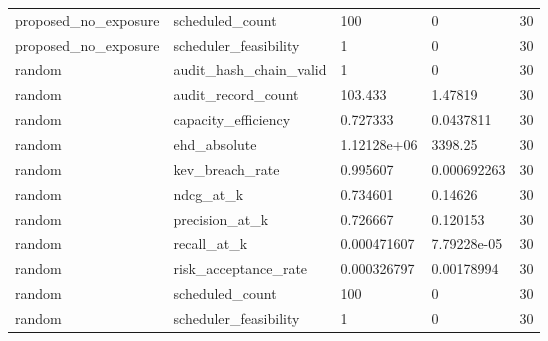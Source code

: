 \begin{tabular}{l l l l l}
proposed\_no\_exposure & scheduled\_count & 100 & 0 & 30 \\
proposed\_no\_exposure & scheduler\_feasibility & 1 & 0 & 30 \\
random & audit\_hash\_chain\_valid & 1 & 0 & 30 \\
random & audit\_record\_count & 103.433 & 1.47819 & 30 \\
random & capacity\_efficiency & 0.727333 & 0.0437811 & 30 \\
random & ehd\_absolute & 1.12128e+06 & 3398.25 & 30 \\
random & kev\_breach\_rate & 0.995607 & 0.000692263 & 30 \\
random & ndcg\_at\_k & 0.734601 & 0.14626 & 30 \\
random & precision\_at\_k & 0.726667 & 0.120153 & 30 \\
random & recall\_at\_k & 0.000471607 & 7.79228e-05 & 30 \\
random & risk\_acceptance\_rate & 0.000326797 & 0.00178994 & 30 \\
random & scheduled\_count & 100 & 0 & 30 \\
random & scheduler\_feasibility & 1 & 0 & 30 \\
\hline
\end{tabular}
